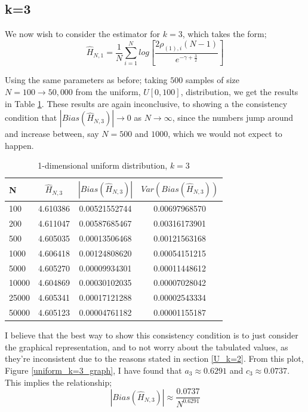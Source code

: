 \documentclass{report}
\begin{document}
\subsection{k=3} \label{U_k=3}
We now wish to consider the estimator for $k=3$, which takes the form;
\begin{equation} 
\hat{H}_{N, 1} = \frac{1}{N} \sum_{i=1}^{N} log \left[ \frac{2\rho_{(1),i} (N-1)}{e^{-\gamma + \frac{3}{2}}} \right] \nonumber
\end{equation}

Using the same parameters as before; taking $500$ samples of size $N=100 \to 50,000$ from the uniform, $U[0, 100]$, distribution, we get the results in Table \ref{uniform_k=3_table}. These results are again inconclusive, to showing a the consistency condition that $|Bias(\hat{H}_{N, 3})| \to 0$ as $N \to \infty$, since the numbers jump around and increase between, say $N=500$ and $1000$, which we would not expect to happen.

\begin{table}
\caption{1-dimensional uniform distribution, $k=3$} \label{uniform_k=3_table}
\begin{center}
\begin{tabular}{| l | c c c|} 
\toprule
N & $\hat{H}_{N, 3}$ & $|Bias(\hat{H}_{N, 3})|$ & $Var(Bias(\hat{H}_{N, 3}))$ \\
\midrule[1pt]
100     & 4.610386     & 0.00521552744     & 0.00697968570  \\
200     & 4.611047     & 0.00587685467     & 0.00316173901  \\
500     & 4.605035     & 0.00013506468     & 0.00121563168  \\
1000    & 4.606418     & 0.00124808620     & 0.00054151215  \\
5000    & 4.605270     & 0.00009934301     & 0.00011448612  \\
10000   & 4.604869     & 0.00030102035     & 0.00007028042  \\
25000   & 4.605341     & 0.00017121288     & 0.00002543334  \\
50000   & 4.605123     & 0.00004761182     & 0.00001155187  \\
\hline
\end{tabular}
\end{center}
\end{table}

I believe that the best way to show this consistency condition is to just consider the graphical representation, and to not worry about the tabulated values, as they're inconsistent due to the reasons stated in section \ref{U_k=2}. From this plot, Figure \ref{uniform_k=3_graph}, I have found that $a_{3} \approx 0.6291$ and $c_{3} \approx 0.0737$. This implies the relationship;
\begin{equation}
|Bias(\hat{H}_{N, 3})| \approx \frac{0.0737}{N^{0.6291}}\nonumber
\end{equation}
\end{document}
